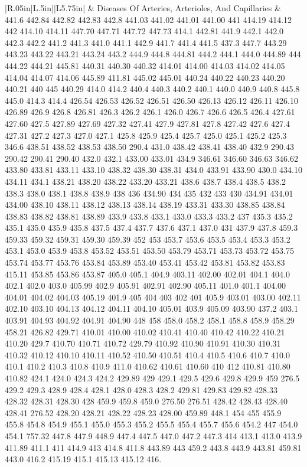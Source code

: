 \begin{longtable}{|R{.05in}|L{.5in}||L{5.75in}|}
   & Diseases Of Arteries, Arterioles, And Capillaries  &  441.6 442.84 442.82 442.83 442.8 441.03 441.02 441.01 441.00 441 414.19 414.12 442 414.10 414.11 447.70 447.71 447.72 447.73 414.1 442.81 441.9 442.1 442.0 442.3 442.2 441.2 441.3 441.0 441.1 442.9 441.7 441.4 441.5 437.3 447.7 443.29 443.23 443.22 443.21 443.24 443.2 444.9 444.8 444.81 444.2 444.1 444.0 444.89 444 444.22 444.21 445.81 440.31 440.30 440.32 414.01 414.00 414.03 414.02 414.05 414.04 414.07 414.06 445.89 411.81 445.02 445.01 440.24 440.22 440.23 440.20 440.21 440 445 440.29 414.0 414.2 440.4 440.3 440.2 440.1 440.0 440.9 440.8 445.8 445.0 414.3 414.4 426.54 426.53 426.52 426.51 426.50 426.13 426.12 426.11 426.10 426.89 426.9 426.8 426.81 426.3 426.2 426.1 426.0 426.7 426.6 426.5 426.4 427.61 427.60 427.5 427.89 427.69 427.32 427.41 427.9 427.81 427.8 427.42 427.6 427.4 427.31 427.2 427.3 427.0 427.1 425.8 425.9 425.4 425.7 425.0 425.1 425.2 425.3 346.6 438.51 438.52 438.53 438.50 290.4 431.0 438.42 438.41 438.40 432.9 290.43 290.42 290.41 290.40 432.0 432.1 433.00 433.01 434.9 346.61 346.60 346.63 346.62 433.80 433.81 433.11 433.10 438.32 438.30 438.31 434.0 433.91 433.90 430.0 434.10 434.11 434.1 438.21 438.20 438.22 433.20 433.21 438.6 438.7 438.4 438.5 438.2 438.3 438.0 438.1 438.8 438.9 438 436 434.90 434 435 432 433 430 434.91 434.01 434.00 438.10 438.11 438.12 438.13 438.14 438.19 433.31 433.30 438.85 438.84 438.83 438.82 438.81 438.89 433.9 433.8 433.1 433.0 433.3 433.2 437 435.3 435.2 435.1 435.0 435.9 435.8 437.5 437.4 437.7 437.6 437.1 437.0 431 437.9 437.8 459.3 459.33 459.32 459.31 459.30 459.39 452 453 453.7 453.6 453.5 453.4 453.3 453.2 453.1 453.0 453.9 453.8 453.52 453.51 453.50 453.79 453.71 453.73 453.72 453.75 453.74 453.77 453.76 453.84 453.89 453.40 453.41 453.42 453.81 453.82 453.83 415.11 453.85 453.86 453.87 405.0 405.1 404.9 403.11 402.00 402.01 404.1 404.0 402.1 402.0 403.0 405.99 402.9 405.91 402.91 402.90 405.11 401.0 401.1 404.00 404.01 404.02 404.03 405.19 401.9 405 404 403 402 401 405.9 403.01 403.00 402.11 402.10 403.10 404.13 404.12 404.11 404.10 405.01 403.9 405.09 403.90 437.2 403.1 403.91 404.93 404.92 404.91 404.90 448 458 458.0 458.2 458.1 458.8 458.9 458.29 458.21 426.82 429.71 410.01 410.00 410.02 410.41 410.40 410.42 410.22 410.21 410.20 429.7 410.70 410.71 410.72 429.79 410.92 410.90 410.91 410.30 410.31 410.32 410.12 410.10 410.11 410.52 410.50 410.51 410.4 410.5 410.6 410.7 410.0 410.1 410.2 410.3 410.8 410.9 411.0 410.62 410.61 410.60 410 412 410.81 410.80 410.82 424.1 424.0 424.3 424.2 429.89 429 429.1 429.5 429.6 429.8 429.9 459 276.5 429.2 429.3 428.9 428.4 428.1 428.0 428.3 428.2 429.81 429.83 429.82 428.33 428.32 428.31 428.30 428 459.9 459.8 459.0 276.50 276.51 428.42 428.43 428.40 428.41 276.52 428.20 428.21 428.22 428.23 428.00 459.89 448.1 454 455 455.9 455.8 454.8 454.9 455.1 455.0 455.3 455.2 455.5 455.4 455.7 455.6 454.2 447 454.0 454.1 757.32 447.8 447.9 448.9 447.4 447.5 447.0 447.2 447.3 414 413.1 413.0 413.9 411.89 411.1 411 414.9 413 414.8 411.8 443.89 443 459.2 443.8 443.9 443.81 459.81 443.0 416.2 415.19 415.1 415.13 415.12 416.\\\hline

\end{longtable}
